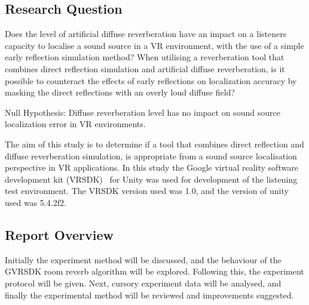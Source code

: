 \documentclass[paper=a4, fontsize=10pt, font=arial]{scrartcl} %
\numberwithin{equation}{section} %
\numberwithin{figure}{section} %
\numberwithin{table}{section} %
\begin{document}
\subsection{Research Question}

Does the level of artificial diffuse reverberation have an impact on a listeners capacity to localise a sound source in a VR environment, with the use of a simple early reflection simulation method? When utilising a reverberation tool that combines direct reflection simulation and artificial diffuse reverberation, is it possible to counteract the effects of early reflections on localization accuracy by masking the direct reflections with an overly loud diffuse field?

Null Hypothesis: Diffuse reverberation level has no impact on sound source localization error in VR environments.

The aim of this study is to determine if a tool that combines direct reflection and diffuse reverberation simulation, is appropriate from a sound source localisation perspective in VR applications. In this study the Google virtual reality software development kit (VRSDK)~\cite{googlevr2016} for Unity was used for development of the listening test environment. The VRSDK version used was 1.0, and the version of unity used was 5.4.2f2.

\subsection{Report Overview}

Initially the experiment method will be discussed, and the behaviour of the GVRSDK room reverb algorithm will be explored. Following this, the experiment protocol will be given. Next, cursory experiment data will be analysed, and finally the experimental method will be reviewed and improvements suggested.

  
\end{document}
